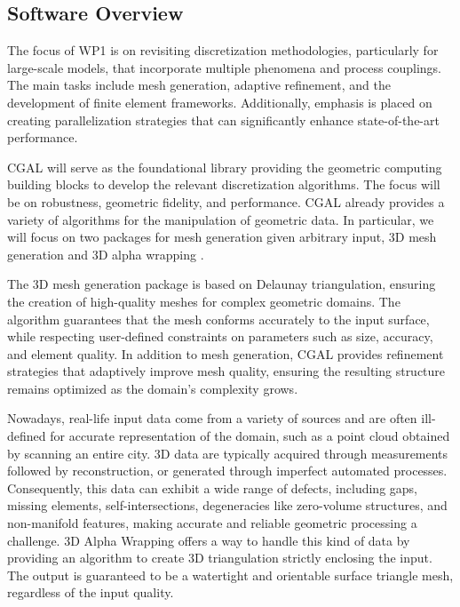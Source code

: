 \subsection{Software Overview}
\label{sec:WP1:CGAL:summary}


The focus of WP1 is on revisiting discretization methodologies, particularly for large-scale models,
that incorporate multiple phenomena and process couplings. The main tasks include mesh generation, adaptive refinement, 
and the development of finite element frameworks. Additionally, emphasis is placed on creating parallelization 
strategies that can significantly enhance state-of-the-art performance. 

CGAL will serve as the foundational library providing the geometric computing building blocks to develop the 
relevant discretization algorithms. The focus will be on robustness, geometric fidelity, and performance. 
CGAL already provides a variety of algorithms for the manipulation of geometric data.
In particular, we will focus on two packages for mesh generation given arbitrary input, 
3D mesh generation \cite{jamin_cgalmesh_2015,alliez_3d_2024} and 3D alpha wrapping \cite{portaneri_alpha_2022,alliez_3d_2024-1}.

The 3D mesh generation package is based on Delaunay triangulation, ensuring the creation of high-quality meshes for complex geometric domains. 
The algorithm guarantees that the mesh conforms accurately to the input surface, while respecting user-defined constraints on parameters 
such as size, accuracy, and element quality. In addition to mesh generation, CGAL provides refinement strategies that adaptively improve 
mesh quality, ensuring the resulting structure remains optimized as the domain's complexity grows.



Nowadays, real-life input data come from a variety of sources and are often ill-defined for accurate representation of the domain, 
such as a point cloud obtained by scanning an entire city. 3D data are typically acquired through measurements followed by reconstruction, 
or generated through imperfect automated processes. Consequently, this data can exhibit a wide range of defects, including gaps, 
missing elements, self-intersections, degeneracies like zero-volume structures, and non-manifold features, making accurate 
and reliable geometric processing a challenge. 3D Alpha Wrapping offers a way to handle this kind of data by providing an algorithm 
to create 3D triangulation strictly enclosing the input. The output is guaranteed to be a watertight and orientable surface triangle mesh, 
regardless of the input quality.


